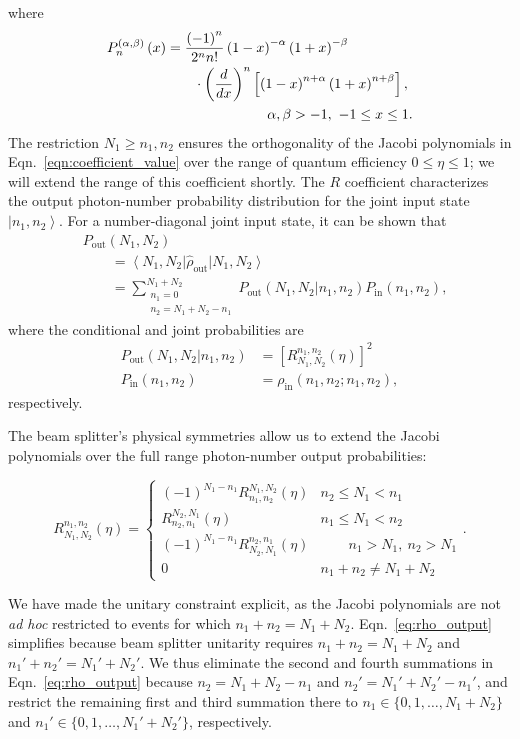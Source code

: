 \documentclass[aps,twocolumn,secnumarabic,amsmath,amssymb,pra,groupedaddress,
showpacs, showkeys]{revtex4-1}
\newcommand{\bra}[1]{\left\langle #1 \right|}
\newcommand{\ket}[1]{\left|#1\right\rangle}
\newcommand{\pna}[1]{\left(#1\right)}
\newcommand{\pnb}[1]{\left[#1\right]}
\newcommand{\eqn}[1]{
\begin{equation}
	#1
\end{equation}
}
\begin{document}
where
\begin{align}
P_n^{\pna{\alpha,\beta}}\pna{x} & = \frac{\pna{-1}^n}{2^n
  n!}\pna{1-x}^{-\alpha}\pna{1+x}^{-\beta}\nonumber \\ & \qquad \cdot\pna{\frac{d}{dx}}^n\pnb{\pna{1-x}^{n+\alpha}\pna{1+x}^{n+\beta}},\nonumber \\
& \hspace{1.0in} \alpha,\beta >-1,~-1\leq x \leq 1.
\end{align}
The restriction $N_1\geq n_1, n_2$ ensures the orthogonality of the Jacobi
polynomials in Eqn.~\ref{eqn:coefficient_value} over the range of quantum
efficiency $0\leq \eta \leq 1$; we will extend the range of this coefficient
shortly. The $R$ coefficient characterizes the output photon-number probability
distribution for the joint input state $\ket{n_1,n_2}$. For a number-diagonal
joint input state, it can be shown that
\begin{align}
    & P_{\textrm{out}}\pna{N_1, N_2}  \nonumber \\ 
    & \qquad = \bra{N_1, N_2} \hat{\rho}_{\textrm{out}}\ket{N_1, N_2} \nonumber \\
    & \qquad = \sum_{\substack{n_1=0\\n_2=N_1+N_2-n_1}}^{N_1+N_2}P_{\textrm{out}}\pna{N_1,
      N_2|n_1, n_2} P_{\textrm{in}}\pna{n_1, n_2},
\end{align}
where the conditional and joint probabilities are 
\begin{align}
P_{\textrm{out}}\pna{N_1, N_2|n_1, n_2} & =
\pnb{R_{N_1,N_2}^{n_1,n_2}\pna{\eta}}^2 \nonumber \\
P_{\textrm{in}}\pna{n_1, n_2} & = \rho_{\textrm{in}}\pna{n_1,n_2;n_1,n_2},
\end{align} respectively.

The beam splitter's physical symmetries allow us to extend the Jacobi
polynomials over the full range photon-number output probabilities:
\eqn{
   R_{N_1,N_2}^{n_1,n_2}\pna{\eta} = \left\{
     \begin{array}{lr}
        \pna{-1}^{N_1 - n_1} R_{n_1,n_2}^{N_1,N_2}\pna{\eta} & n_2 \leq N_1 < n_1 \\
       R_{n_2,n_1}^{N_2,N_1}\pna{\eta} & n_1 \leq N_1 < n_2 \\
	   \pna{-1}^{N_1 - n_1} R_{N_2,N_1}^{n_2,n_1}\pna{\eta} &\qquad n_1 > N_1,~n_2 > N_1 \\
	0 & n_1+n_2\neq N_1+N_2
     \end{array}
\right..}
We have made the unitary constraint explicit, as the Jacobi polynomials are not
\emph{ad hoc} restricted to events for which
$n_1+n_2=N_1+N_2$. Eqn.~\ref{eq:rho_output} simplifies because beam splitter
unitarity requires $n_1+n_2=N_1+N_2$ and $n_1'+n_2'=N_1'+N_2'$. We thus
eliminate the second and fourth summations in Eqn.~\ref{eq:rho_output} because
$n_2=N_1+N_2-n_1$ and $n_2'=N_1'+N_2'-n_1'$, and restrict the remaining first
and third summation there to $n_1\in\{0,1,\ldots,N_1+N_2\}$ and
$n_1'\in\{0,1,\ldots,N_1'+N_2'\}$, respectively.
\end{document}
